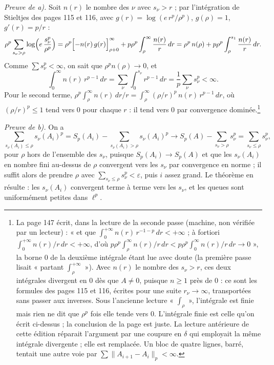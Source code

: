 \documentclass[11pt,a4paper]{article}
\begin{document}
\emph{Preuve de a).} Soit $n(r)$ le nombre des $\nu$ avec $s_\nu > r$ ; par
l'intégration de Stieltjes des pages 115 et 116, avec $g(r) = \log(e\,r^p/
\rho^p)$, $g(\rho) = 1$, $g'(r) = p/r$ :
\[
  \rho^p\sum_{s_\nu > \rho} \log\Bigl(e\,\frac{s_\nu^p}{\rho^p}\Bigr)
  = \rho^p\Bigl[-n(r)\,g(r)\Bigr]_{\rho+0}^{\infty} + p\rho^p\int_\rho^\infty \frac{n(r)}{r}\,dr
  = \rho^p\,n(\rho) + p\rho^p\int_\rho^{s_1} \frac{n(r)}{r}\,dr .
\]
Comme $\sum s_\nu^p < \infty$, on sait que $\rho^p n(\rho) \to 0$, et
\[
  \int_0^\infty n(r)\,r^{p-1}\,dr = \sum_\nu \int_0^{s_\nu} r^{p-1}\,dr =
  \frac1p\sum_\nu s_\nu^p < \infty .
\]
Pour le second terme, $\rho^p\int_\rho^\infty n(r)\,dr/r = \int_\rho^\infty
(\rho/r)^p\,n(r)\,r^{p-1}\,dr$, où $(\rho/r)^p \leq 1$ tend vers $0$ pour
chaque $r$ : il tend vers $0$ par convergence dominée.\footnote{La page 147
écrit, dans la lecture de la seconde passe (machine, non vérifiée par un
lecteur) : « et que $\int_0^{+\infty} n(r)\,r^{-1-p}\,dr < +\infty$ ; à
fortiori $\int_0^{+\infty} n(r)/r\,dr < +\infty$, d'où $p\rho^p\int_\rho^\infty
n(r)/r\,dr < p\rho^p\int_0^\infty n(r)/r\,dr \to 0$ », la borne $0$ de la
deuxième intégrale étant lue avec doute (la première passe lisait « partant
$\int_\rho^{+\infty}$ »). Avec $n(r)$ le nombre des $s_\nu > r$, ces deux
intégrales divergent en $0$ dès que $A \neq 0$, puisque $n \geq 1$ près de
$0$ : ce sont les formules des pages 115 et 116, écrites pour une suite
$r_\nu \to \infty$, transportées sans passer aux inverses. Sous l'ancienne
lecture « $\int_\rho$ », l'intégrale est finie mais rien ne dit que $\rho^p$
fois elle tende vers $0$. L'intégrale finie est celle qu'on écrit
ci-dessus ; la conclusion de la page est juste. La lecture antérieure de
cette édition réparait l'argument par une coupure en $\delta$ qui employait
la même intégrale divergente ; elle est remplacée. Un bloc de quatre
lignes, barré, tentait une autre voie par $\sum \|A_{i+1} - A_i\|_p <
\infty$.}

\emph{Preuve de b).} On a
\[
  \sum_{s_\nu(A_i) \leq \rho} s_\nu(A_i)^p = S_p(A_i) - \sum_{s_\nu(A_i) > \rho} s_\nu(A_i)^p
  \longrightarrow S_p(A) - \sum_{s_\nu > \rho} s_\nu^p = \sum_{s_\nu \leq \rho} s_\nu^p,
\]
pour $\rho$ hors de l'ensemble des $s_\nu$, puisque $S_p(A_i) \to S_p(A)$ et
que les $s_\nu(A_i)$ en nombre fini au-dessus de $\rho$ convergent vers les
$s_\nu$ par convergence en norme ; il suffit alors de prendre $\rho$ avec
$\sum_{s_\nu \leq \rho} s_\nu^p < \varepsilon$, puis $i$ assez grand. Le
théorème en résulte : les $s_\nu(A_i)$ convergent terme à terme vers les
$s_\nu$, et les queues sont uniformément petites dans $\ell^p$.
\end{document}
